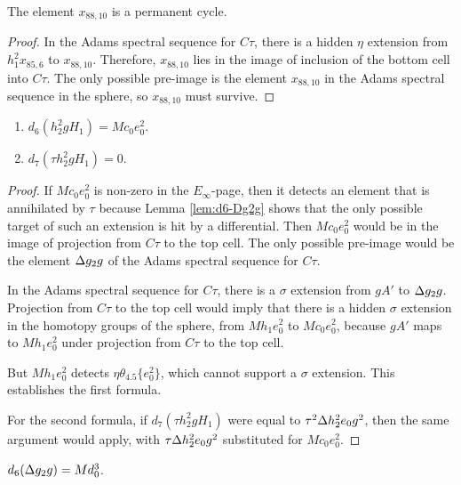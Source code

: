 \begin{lemma}
\label{lem:perm-x88,10}
The element $x_{88,10}$ is a permanent cycle.
\end{lemma}

\begin{proof}
In the Adams spectral sequence for $C\tau$, there is a hidden
$\eta$ extension from $h_1^2 x_{85,6}$ to $x_{88,10}$.
Therefore, $x_{88,10}$ lies in the image of inclusion of the
bottom cell into $C\tau$.
The only possible pre-image is the element $x_{88,10}$ in the
Adams spectral sequence in the sphere, so $x_{88,10}$ must survive.
\end{proof}

\begin{lemma}
\label{lem:d6-h2^2gH1}
\mbox{}
\begin{enumerate}
\item
{}
$d_6(h_2^2 g H_1) = M c_0 e_0^2$.
\item
{}
$d_7(\tau h_2^2 g H_1) = 0$.
\end{enumerate}
\end{lemma}

\begin{proof}
If $M c_0 e_0^2$ is non-zero in the $E_\infty$-page, then it detects
an element that is annihilated by $\tau$ because Lemma \ref{lem:d6-Dg2g}
shows that the only possible target of such an extension is hit
by a differential.
Then $M c_0 e_0^2$ would be in the image of projection 
from $C\tau$ to the top cell.
The only possible pre-image would be the element $\Delta g_2 g$ of the Adams
spectral sequence for $C\tau$.

In the Adams spectral sequence for $C\tau$, there is a $\sigma$
extension from $g A'$ to $\Delta g_2 g$.  
Projection from $C\tau$ to the top cell would imply that there
is a hidden $\sigma$ extension in the homotopy groups of the sphere,
from $M h_1 e_0^2$ to $M c_0 e_0^2$, because
$g A'$ maps to $M h_1 e_0^2$ under projection from $C\tau$
to the top cell.

But $M h_1 e_0^2$ detects $\eta \theta_{4.5} \{ e_0^2 \}$,
which cannot support a $\sigma$ extension.  This establishes the
first formula.

For the second formula, 
if $d_7(\tau h_2^2 g H_1)$ were equal to $\tau^2 \Delta h_2^2 e_0 g^2$,
then the same argument would apply,
with $\tau \Delta h_2^2 e_0 g^2$ substituted for $M c_0 e_0^2$.
\end{proof}

\begin{lemma}
\label{lem:d6-Dg2g}
$d_6(\Delta g_2 g) = M d_0^3$.
\end{lemma}

